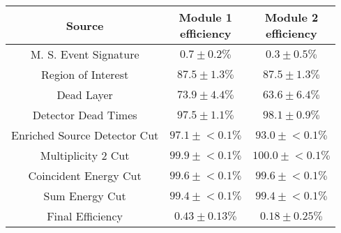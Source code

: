 \begin{tabular}{|c|c|c|}
\hline
  Source & \makecell{Module 1\\efficiency} & \makecell{Module 2\\efficiency} \\
\hline
  M. S. Event Signature & $0.7 \pm 0.2\%$ & $0.3 \pm 0.5\%$ \\
  Region of Interest & $87.5 \pm 1.3\%$ & $87.5 \pm 1.3\%$ \\
  Dead Layer & $73.9 \pm 4.4\%$ & $63.6 \pm 6.4\%$ \\
  Detector Dead Times & $97.5 \pm 1.1\%$ & $98.1 \pm 0.9\%$ \\
  Enriched Source Detector Cut & $97.1 \pm{}<\!0.1\%$ & $93.0 \pm{}<\!0.1\%$ \\
  Multiplicity 2 Cut & $99.9 \pm{}<\!0.1\%$ & $100.0 \pm{}<\!0.1\%$ \\
  Coincident Energy Cut & $99.6 \pm{}<\!0.1\%$ & $99.6 \pm{}<\!0.1\%$ \\
  Sum Energy Cut & $99.4 \pm{}<\!0.1\%$ & $99.4 \pm{}<\!0.1\%$ \\
  \hline Final Efficiency & $0.43 \pm 0.13\%$ & $0.18 \pm 0.25\%$ \\
\hline
\end{tabular}
